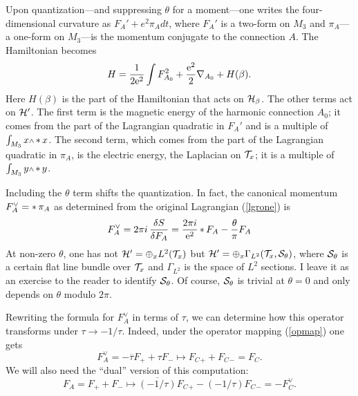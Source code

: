Upon quantization---and suppressing $\theta$ for a
moment---one writes the four-dimensional curvature as
$F_A'+e^2\pi_A dt$, where $F_A'$ is a two-form on $M_3$ and $\pi_A$---a
one-form on $M_3$---is the momentum conjugate to the connection $A$.
The Hamiltonian becomes
\begin{equation}
H=\frac1{2\text{e}^2}\int F_{A_0}^2+{\text{e}^2\over 2}\nabla_{A_0}+ H(\beta).
\end{equation}
Here $H(\beta)$ is
the part of the Hamiltonian that acts on ${\cal H}_\beta$.  The other
terms act on ${\cal H}'$.  The first term is the magnetic energy
of the harmonic connection $A_0$; it comes from the part of the Lagrangian
quadratic in $F_A'$ and is a multiple of $\int_{M_3}x
\wdg\hstar x$.  The second term, which comes from the part of the Lagrangian
quadratic in $\pi_A$, is the electric energy, the Laplacian
on ${\cal T}_x$; it is a multiple of $\int_{M_3}y\wdg\hstar y$.


Including the $\theta$ term  shifts the quantization.  In fact, the
canonical momentum $F_A^\vee=\mathop{*} \pi_A$  as determined from the
original Lagrangian (\ref{lgrone}) is
\begin{equation}\label{fvee}
F_A^\vee
 = 2\pi i \,\frac{\delta S}{\delta F_A}
=\frac{2\pi i}{\text{e}^2} \mathop{*} F_A - \frac{\theta}{\pi} F_A
\end{equation}
At non-zero $\theta$, one has not ${\cal H}'=\oplus_x L^2({\cal T}_x)$
but ${\cal H}'=\oplus_x\Gamma_{L^2}({\cal T}_x,{\cal S}_\theta)$, where
${\cal S}_\theta$ is a certain flat line bundle over ${\cal T}_x$ and
$\Gamma_{L^2}$ is the space of $L^2$ sections.
  I leave it as an exercise to the reader
to identify ${\cal S}_\theta$.  Of course, ${\cal S}_\theta$ is trivial
at $\theta=0$ and only
depends on $\theta$ modulo $2\pi$.


Rewriting the formula for $F_A^\vee$
 in terms of $\tau$, we can determine how this operator transforms
 under $\tau\to -1/\tau$.  Indeed, under the operator mapping
(\ref{opmap}) one gets
\begin{equation}\label{fveeto}
F_A^\vee = -\overline{\tau}F_+ + \tau F_-
\mapsto F_C{}_++F_C{}_-=F_C.
\end{equation}
We will also need the ``dual'' version of this computation:
\begin{equation}\label{dualcomp}
F_A=F_++F_-\mapsto\overline{(-1/\tau)}F_C{}_+-(-1/\tau)F_C{}_- = -F_C^\vee.
\end{equation}

